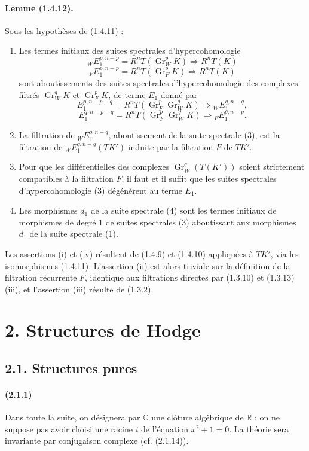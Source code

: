 \documentclass[10pt]{article}
\newcommand{\C}{\mathbb C}
\newcommand{\Gr}{\operatorname{Gr}}
\newcommand{\R}{\mathbb R}
\begin{document}
\paragraph{Lemme (1.4.12).} Sous les hypothèses de (1.4.11) :
\begin{enumerate}[label=(\roman*)]
\item Les termes initiaux des suites spectrales d'hypercohomologie
\[
\tag{1}
{}_WE_1^{p,n-p}=R^nT(\Gr_W^pK)\Rightarrow R^nT(K)
\]
\[
\tag{2}
{}_FE_1^{p,n-p}=R^nT(\Gr_F^pK)\Rightarrow R^nT(K)
\]
sont aboutissements des suites spectrales d'hypercohomologie des complexes filtrés $\Gr_W^qK$ et $\Gr_F^pK$, de terme $E_1$ donné par
\[
\tag{3}
E_1^{p,n-p-q}=R^nT(\Gr_F^p\Gr_W^qK)\Rightarrow {}_WE_1^{q,n-q},
\]
\[
\tag{4}
E_1^{q,n-p-q}=R^nT(\Gr_F^p\Gr_W^qK)\Rightarrow {}_FE_1^{p,n-p}.
\]
\item La filtration de ${}_WE_1^{q,n-q}$, aboutissement de la suite spectrale (3), est la filtration de ${}_WE_1^{q,n-q}(TK')$ induite par la filtration $F$ de $TK'$.
\item Pour que les différentielles des complexes $\Gr_W^q(T(K'))$ soient strictement compatibles à la filtration $F$, il faut et il suffit que les suites spectrales d'hypercohomologie (3) dégénèrent au terme $E_1$.
\item Les morphismes $d_1$ de la suite spectrale (4) sont les termes initiaux de morphismes de degré $1$ de suites spectrales (3) aboutissant aux morphismes $d_1$ de la suite spectrale (1).
\end{enumerate}
Les assertions (i) et (iv) résultent de (1.4.9) et (1.4.10) appliquées à $TK'$, via les isomorphismes (1.4.11). L'assertion (ii) est alors triviale sur la définition de la filtration récurrente $F$, identique aux filtrations directes par (1.3.10) et (1.3.13) (iii), et l'assertion (iii) résulte de (1.3.2).

\section*{2. Structures de Hodge}
\subsection*{2.1. Structures pures}

\paragraph{(2.1.1)} Dans toute la suite, on désignera par $\C$ une clôture algébrique de $\R$ : on ne suppose pas avoir choisi une racine $i$ de l'équation $x^2+1=0$. La théorie sera invariante par conjugaison complexe (cf. (2.1.14)).
\end{document}
